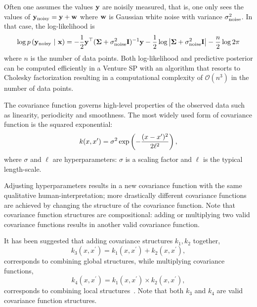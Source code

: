 Often one assumes the values $\mathbf{y}$ are noisily measured, that is, one only sees the values of $\mathbf{y}_{\textrm{noisy}} = \mathbf{y} + \mathbf{w}$ where $\mathbf{w}$ is Gaussian white noise with variance $\sigma_{\textrm{noise}}^2$.
In that case, the log-likelihood is
\begin{equation}
\log p\left( \mathbf{y}_{\textrm{noisy}} \ \middle\vert\  \mathbf{x} \right) =
-\frac12 \mathbf{y}^\top (\bm{\Sigma}
+ \sigma_{\textrm{noise}}^2 \mathbf{I})^{-1} \mathbf{y}
- \frac12\log \left\lvert \bm{\Sigma} + \sigma_{\textrm{noise}}^2 \mathbf{I} \right\rvert
- \frac{n}{2}\log 2\pi
\end{equation}
where $n$ is the number of data points.
Both log-likelihood and predictive posterior can be computed efficiently in a Venture SP with an algorithm that resorts to Cholesky factorization\citep[chap. 2]{rasmussen2006gaussian} resulting in a computational complexity of $\mathcal{O}(n^3)$ in the number of data points.



The covariance function governs high-level properties of the observed data such as linearity, periodicity and smoothness.
The most widely used form of covariance function is the squared exponential:
\begin{equation}
  k(x,x^\prime) = \sigma^2 \exp\left( -\frac{(x-x^\prime)^2}{2\ell^2} \right),
\end{equation}
where $\sigma$ and $\ell$ are hyperparameters: $\sigma$ is a scaling factor and $\ell$ is the typical length-scale.

Adjusting hyperparameters results in a new covariance function with the same qualitative human-interpretation; more drastically different covariance functions are achieved by changing the structure of the covariance function.
Note that covariance function structures are compositional: adding or multiplying two valid covariance functions results in another valid covariance function. 

It has been suggested that adding covariance structures $k_1,k_2$ together,
\begin{equation}
k_3(x,x^\prime) = k_1(x,x^\prime) + k_2(x,x^\prime),
\end{equation}
corresponds to combining global structures, while multiplying covariance functions,
\begin{equation}
k_4(x,x^\prime) = k_1(x,x^\prime) \times k_2(x,x^\prime),
\end{equation}
corresponds to combining local structures~\citep{duvenaud2013structure}.
Note that both $k_3$ and $k_4$ are valid covariance function structures.






